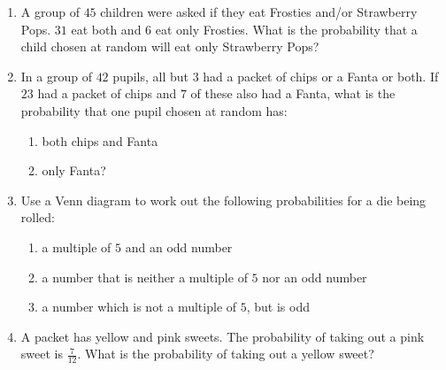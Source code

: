 \begin{eocexercises}{}
  \begin{enumerate}[itemsep=5pt, label=\textbf{\arabic*}. ]
  \item A group of $45$ children were asked if they eat Frosties and/or
    Strawberry Pops. $31$ eat both and $6$ eat only Frosties. What is the
    probability that a child chosen at random will eat only Strawberry
    Pops?
  \item In a group of $42$ pupils, all but $3$ had a packet of chips
    or a Fanta or both. If $23$ had a packet of chips and $7$ of these
    also had a Fanta, what is the probability that one pupil chosen at
    random has:
    \begin{enumerate}[noitemsep, label=\textbf{(\alph*)} ]
    \item both chips and Fanta
    \item only Fanta?
    \end{enumerate}
  \item Use a Venn diagram to work out the following probabilities
    for a die being rolled:
    \begin{enumerate}[noitemsep, label=\textbf{(\alph*)} ]
    \item a multiple of $5$ and an odd number
    \item a number that is neither a multiple of $5$ nor an odd
      number
    \item a number which is not a multiple of $5$, but is odd
    \end{enumerate}
  \item A packet has yellow and pink sweets. The probability of taking
    out a pink sweet is $\frac{7}{12}$. What is the probability of taking out a yellow sweet?


\end{enumerate}
\end{eocexercises}
